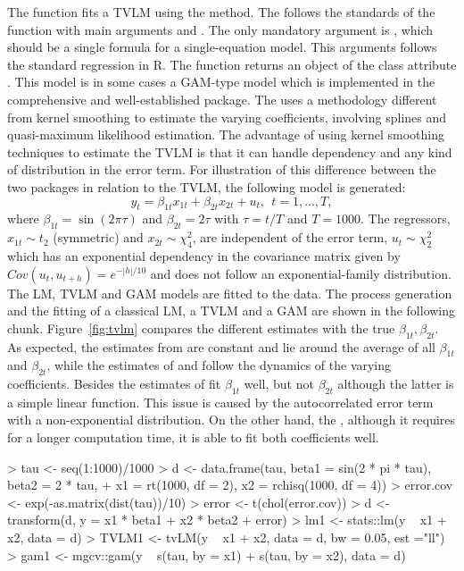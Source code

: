 The function  fits a TVLM using the  method.  The  follows the standards of the function  with main arguments  and . The only mandatory argument is , which should be a single formula for a single-equation model. This arguments follows the standard regression  in R. The function  returns an object of the class attribute . This model is in some cases a GAM-type model which is implemented in the comprehensive and well-established  package. The  uses a methodology different from kernel smoothing to estimate the varying coefficients, involving splines and quasi-maximum likelihood estimation. The advantage of using kernel smoothing techniques to estimate the TVLM is that it can handle dependency and any kind of distribution in the error term. For illustration of this difference between the two packages in relation to the TVLM, the following model is generated:
\begin{equation}
y_t  = \beta_{1t} x_{1t}+ \beta_{2t} x_{2t} + u_t, \ \ t = 1, \ldots, T,
\label{eq:ex1}
\end{equation}
where $\beta_{1t}= \sin(2\pi\tau)$ and $\beta_{2t} = 2\tau$ with $\tau = t/T$ and $T = 1000$. The regressors, $x_{1t}\sim t_2$ (symmetric) and $
x_{2t} \sim \chi^2_4$, are independent of the error term, $u_t \sim \chi^2_2$ which has an exponential dependency in the covariance matrix given by $Cov(u_t, u_{t+h}) = e^{-|h|/10}$ and does not follow an exponential-family distribution. The LM, TVLM and GAM models are fitted to the data. The process generation and the fitting of a classical LM, a TVLM and a GAM are shown in the following chunk. Figure~\ref{fig:tvlm} compares the different estimates with the true $\beta_{1t}, \beta_{2t}$. As expected, the estimates from  are constant and lie around the average of all $\beta_{1t}$ and $\beta_{2t}$, while the estimates of  and  follow the dynamics of the varying coefficients. Besides the estimates of  fit $\beta_{1t}$ well, but not $\beta_{2t}$ although the latter is a simple linear function. This issue is caused by the autocorrelated error term with a non-exponential distribution. On the other hand, the , although it requires for a longer computation time, it is able to fit both coefficients well.


\begin{Schunk}
\begin{Sinput}
> tau <- seq(1:1000)/1000
> d <- data.frame(tau, beta1 = sin(2 * pi * tau), beta2 = 2 * tau,
+                 x1 = rt(1000, df = 2), x2 = rchisq(1000, df = 4))
> error.cov <- exp(-as.matrix(dist(tau))/10)
> error <-  t(chol(error.cov)) %
> d <- transform(d, y = x1 * beta1 + x2 * beta2 + error)
> lm1 <- stats::lm(y ~ x1 + x2, data = d)
> TVLM1 <- tvLM(y ~ x1 + x2,  data = d, bw = 0.05, est ="ll")
> gam1 <- mgcv::gam(y ~ s(tau, by = x1) + s(tau, by = x2), data = d)
\end{Sinput}
\end{Schunk}

